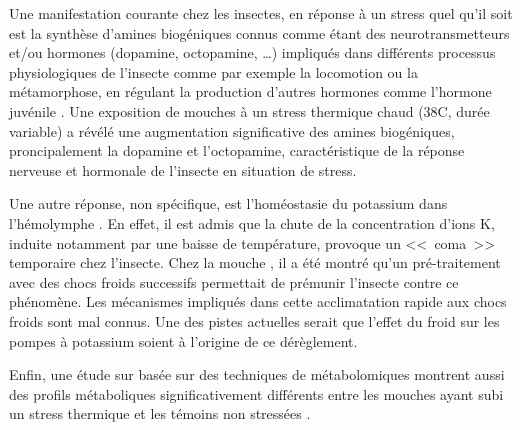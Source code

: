 		Une manifestation courante chez les insectes, en réponse à un stress quel qu'il soit est la synthèse d'amines biogéniques connus comme étant des neurotransmetteurs et/ou hormones (dopamine, octopamine, \ldots) impliqués dans différents processus physiologiques de l'insecte comme par exemple la locomotion ou la métamorphose, en régulant la production d'autres hormones comme l'hormone juvénile \cite{hirashima2000}.
		Une exposition de mouches  à un stress thermique chaud (38\textdegree{}C, durée variable) a révélé une augmentation significative des amines biogéniques, proncipalement la dopamine et l'octopamine, caractéristique de la réponse nerveuse et hormonale de l'insecte en situation de stress.

		Une autre réponse, non spécifique, est l'homéostasie du potassium dans l'hémolymphe \cite{armstrong2012}.
		En effet, il est admis que la chute de la concentration d'ions K\up{+}, induite notamment par une baisse de température, provoque un <<~coma~>> temporaire chez l'insecte.
		Chez la mouche , il a été montré qu'un pré-traitement avec des chocs froids successifs permettait de prémunir l'insecte contre ce phénomène.
		Les mécanismes impliqués dans cette acclimatation rapide aux chocs froids sont mal connus.
		Une des pistes actuelles serait que l'effet du froid sur les pompes à potassium soient à l'origine de ce dérèglement.

		Enfin, une étude sur  basée sur des techniques de métabolomiques montrent aussi des profils métaboliques significativement différents entre les mouches ayant subi un stress thermique et les témoins non stressées \cite{malmendal2006}.


